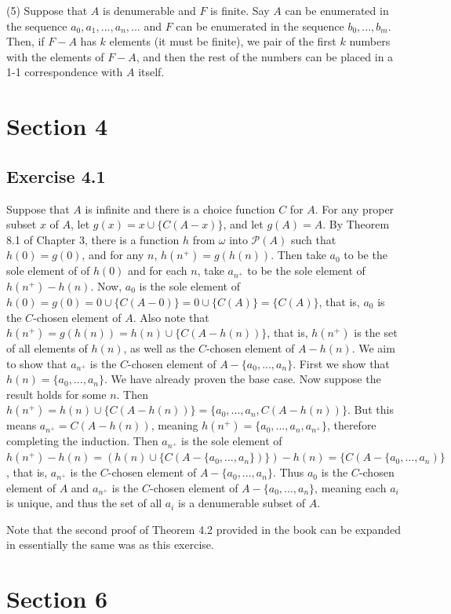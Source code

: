 \documentclass{article}
\theoremstyle{definition}
\begin{document}
(5) Suppose that $A$ is denumerable and $F$ is finite. Say $A$ can be enumerated in the sequence $a_0,a_1,...,a_n,...$ and $F$ can be enumerated in the sequence $b_0,...,b_m$. 
Then, if $F-A$ has $k$ elements (it must be finite), we pair of the first $k$ numbers with the elements of $F-A$, and then the rest of the numbers can be placed in a 1-1 correspondence 
with $A$ itself.

\section*{Section 4}

\subsection*{Exercise 4.1}
Suppose that $A$ is infinite and there is a choice function $C$ for $A$. For any proper subset $x$ of $A$, 
let $g(x)=x\cup\{C(A-x)\}$, and let $g(A)=A$. By Theorem 8.1 of Chapter 3, 
there is a function $h$ from $\omega$ into $\mathcal{P}(A)$ such that $h(0)=g(0)$, and for any $n$, $h(n^+)=g(h(n))$. Then take $a_0$ to be the sole element of of $h(0)$ and for 
each $n$, take $a_{n^+}$ to be the sole element of $h(n^+)-h(n)$. Now, 
$a_0$ is the sole element of $h(0)=g(0)=0\cup\{C(A-0)\}=0\cup\{C(A)\}=\{C(A)\}$, that is, $a_0$ is the $C$-chosen element of $A$. Also note that 
$h(n^+)=g(h(n))=h(n)\cup\{C(A-h(n))\}$, that is, $h(n^+)$ is the set of all elements of $h(n)$, as well as the $C$-chosen element of $A-h(n)$. We aim to show that 
$a_{n^+}$ is the $C$-chosen element of $A-\{a_0,...,a_n\}$. First we show that $h(n)=\{a_0,...,a_n\}$. We have already proven the base case. Now suppose the result holds 
for some $n$. Then $h(n^+)=h(n)\cup\{C(A-h(n))\}=\{a_0,...,a_n,C(A-h(n))\}$. But this means $a_{n^+}=C(A-h(n))$, meaning $h(n^+)=\{a_0,...,a_n,a_{n^+}\}$, therefore completing 
the induction. Then $a_{n^+}$ is the sole element of $h(n^+)-h(n)=(h(n)\cup\{C(A-\{a_0,...,a_n\})\})-h(n)=\{C(A-\{a_0,...,a_n)\}$, that is, $a_{n^+}$ is the $C$-chosen 
element of $A-\{a_0,...,a_n\}$. Thus $a_0$ is the $C$-chosen element of $A$ and $a_{n^+}$ is the $C$-chosen element of $A-\{a_0,...,a_n\}$, meaning each $a_i$ is unique, 
and thus the set of all $a_i$ is a denumerable subset of $A$. 

Note that the second proof of Theorem 4.2 provided in the book can be expanded in essentially the same was as this exercise.

\section*{Section 6}
\end{document}
